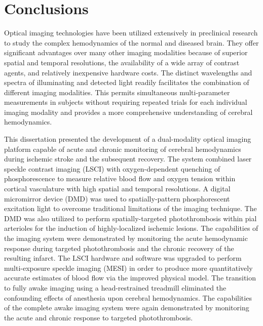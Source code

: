 
\chapter{Conclusions} \label{Chapter_6}

Optical imaging technologies have been utilized extensively in preclinical research to study the complex hemodynamics of the normal and diseased brain. They offer significant advantages over many other imaging modalities because of superior spatial and temporal resolutions, the availability of a wide array of contrast agents, and relatively inexpensive hardware costs. The distinct wavelengths and spectra of illuminating and detected light readily facilitates the combination of different imaging modalities. This permits simultaneous multi-parameter measurements in subjects without requiring repeated trials for each individual imaging modality and provides a more comprehensive understanding of cerebral hemodynamics.

This dissertation presented the development of a dual-modality optical imaging platform capable of acute and chronic monitoring of cerebral hemodynamics during ischemic stroke and the subsequent recovery. The system combined laser speckle contrast imaging (LSCI) with oxygen-dependent quenching of phosphorescence to measure relative blood flow and oxygen tension within cortical vasculature with high spatial and temporal resolutions. A digital micromirror device (DMD) was used to spatially-pattern phosphorescent excitation light to overcome traditional limitations of the imaging technique. The DMD was also utilized to perform spatially-targeted photothrombosis within pial arterioles for the induction of highly-localized ischemic lesions. The capabilities of the imaging system were demonstrated by monitoring the acute hemodynamic response during targeted photothrombosis and the chronic recovery of the resulting infarct. The LSCI hardware and software was upgraded to perform multi-exposure speckle imaging (MESI) in order to produce more quantitatively accurate estimates of blood flow via the improved physical model. The transition to fully awake imaging using a head-restrained treadmill eliminated the confounding effects of anesthesia upon cerebral hemodynamics. The capabilities of the complete awake imaging system were again demonstrated by monitoring the acute and chronic response to targeted photothrombosis.



